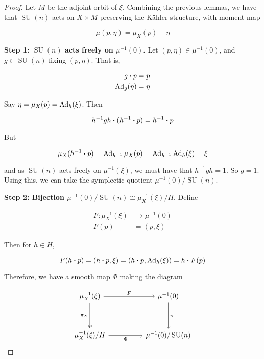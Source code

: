 \documentclass{article}
\DeclareMathOperator{\SU}{SU}
\begin{document}
\begin{proof}
    Let \(M\) be the adjoint orbit of \(\xi\). Combining the previous lemmas, we have that \(\SU(n)\) acts on \(X \times M\) preserving the K\"ahler structure, with moment map

    \[\mu(p,\eta) = \mu_X(p) - \eta\]

    \textbf{Step 1: \(\SU(n)\) acts freely on \(\mu^{-1}(0)\).} Let \((p, \eta) \in \mu^{-1}(0)\), and \(g \in \SU(n)\) fixing \((p, \eta)\). That is,
    
    \begin{align*}
        g \vdot p &= p \\
        \Ad_g(\eta) &= \eta
    \end{align*}

    Say \(\eta = \mu_X(p) = \operatorname{Ad}_h(\xi)\). Then

    \[h^{-1}gh \vdot (h^{-1} \vdot p) = h^{-1}\vdot p\]

    But

    \[\mu_X(h^{-1}\vdot p) = \Ad_{h^{-1}}\mu_X(p) = \Ad_{h^{-1}}\Ad_h(\xi) = \xi\]

    and as \(\SU(n)\) acts freely on \(\mu^{-1}(\xi)\), we must have that \(h^{-1}gh = 1\). So \(g = 1\). Using this, we can take the symplectic quotient \(\mu^{-1}(0)/\SU(n)\).

    \textbf{Step 2: Bijection \(\mu^{-1}(0)/\SU(n) \cong \mu_X^{-1}(\xi)/H\)}. Define
    
    \begin{align*}
        F : \mu_X^{-1}(\xi) &\to \mu^{-1}(0) \\
        F(p) &= (p, \xi)
    \end{align*}

    Then for \(h \in H\),

    \[F(h \vdot p) = (h \vdot p, \xi) = (h \vdot p, \Ad_h(\xi)) = h \vdot F(p)\]

    Therefore, we have a smooth map \(\Phi\) making the diagram

\[\begin{tikzcd}
	{\mu_X^{-1}(\xi)} && {\mu^{-1}(0)} \\
	\\
	{\mu_X^{-1}(\xi)/H} && {\mu^{-1}(0)/\SU(n)}
	\arrow["F", from=1-1, to=1-3]
	\arrow["{\pi_X}"', two heads, from=1-1, to=3-1]
	\arrow["\pi", from=1-3, to=3-3]
	\arrow["\Phi"', from=3-1, to=3-3]
\end{tikzcd}\]


\end{proof}
\end{document}
